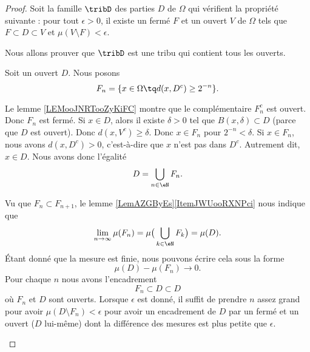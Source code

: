 \begin{proof}
	Soit la famille \( \tribD\) des parties \( D\) de \( \Omega\) qui vérifient la propriété suivante : pour tout \( \epsilon>0\), il existe un fermé \( F\) et un ouvert \( V\) de \( \Omega\) tels que \( F\subset D\subset V\) et \( \mu(V\setminus F)<\epsilon\).

	Nous allons prouver que \( \tribD\) est une tribu qui contient tous les ouverts.

	\begin{subproof}
		Soit un ouvert \( D\). Nous posons
		\begin{equation}
			F_n=\{ x\in \Omega\tq d(x,D^c)\geq 2^{-n} \}.
		\end{equation}
		\begin{subproof}

			Le lemme \ref{LEMooJNRTooZyKiFC} montre que le complémentaire \( F_n^c\) est ouvert. Donc \( F_n\) est fermé.
			Si \( x\in D\), alors il existe \( \delta>0\) tel que \( B(x,\delta)\subset D\) (parce que \( D\) est ouvert). Donc \( d(x,V^c)\geq \delta\). Donc \( x\in F_n\) pour \( 2^{-n}<\delta\).
			Si \( x\in F_n\), nous avons \( d(x,D^c)>0\), c'est-à-dire que \( x\) n'est pas dans \( D^c\). Autrement dit, \( x\in D\).
			\spitem[\( \bigcup_{n\in \eN}F_n = D\)]
			Nous avons donc l'égalité
			\begin{equation}
				D=\bigcup_{n\in \eN}F_n.
			\end{equation}
		\end{subproof}
		Vu que \( F_n\subset F_{n+1}\), le lemme \ref{LemAZGByEs}\ref{ItemJWUooRXNPci} nous indique que
		\begin{equation}
			\lim_{n\to \infty} \mu(F_n)=\mu\big( \bigcup_{k\in \eN}F_k \big)=\mu(D).
		\end{equation}
		Étant donné que la mesure est finie, nous pouvons écrire cela sous la forme
		\begin{equation}
			\mu(D)-\mu(F_n)\to 0.
		\end{equation}
		Pour chaque \( n\) nous avons l'encadrement
		\begin{equation}
			F_n\subset D\subset D
		\end{equation}
		où \( F_n\) et \( D\) sont ouverts. Lorsque \( \epsilon\) est donné, il suffit de prendre \( n\) assez grand pour avoir \( \mu(D\setminus F_n)<\epsilon\) pour avoir un encadrement de \( D\) par un fermé et un ouvert (\( D\) lui-même) dont la différence des mesures est plus petite que \( \epsilon\).


\end{subproof}
\end{proof}
